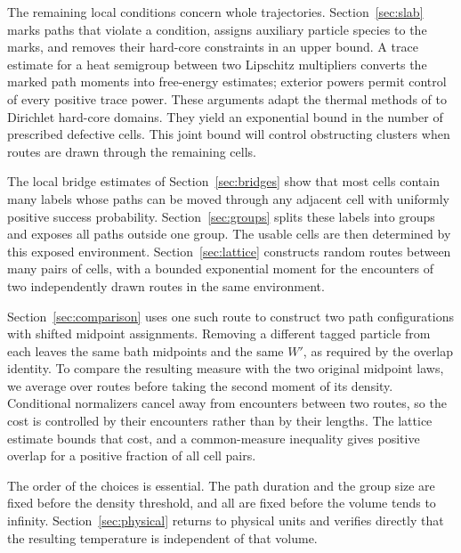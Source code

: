 The remaining local conditions concern whole trajectories.
Section~\ref{sec:slab} marks paths that violate a condition, assigns
auxiliary particle species to the marks, and removes their hard-core
constraints in an upper bound. A trace estimate for a heat semigroup
between two Lipschitz multipliers converts the marked path moments into
free-energy estimates; exterior powers permit control of every positive
trace power. These arguments adapt the thermal methods of \citet{B} to
Dirichlet hard-core domains. They yield an exponential bound in the number
of prescribed defective cells. This joint bound will control obstructing
clusters when routes are drawn through the remaining cells.

The local bridge estimates of Section~\ref{sec:bridges} show that most
cells contain many labels whose paths can be moved through any adjacent
cell with uniformly positive success probability.
Section~\ref{sec:groups} splits these labels into groups and exposes all
paths outside one group. The usable cells are then determined by this
exposed environment. Section~\ref{sec:lattice} constructs random routes
between many pairs of cells, with a bounded exponential moment for the
encounters of two independently drawn routes in the same environment.

Section~\ref{sec:comparison} uses one such route to construct two path
configurations with shifted midpoint assignments. Removing a different
tagged particle from each leaves the same bath midpoints and the same
$W'$, as required by the overlap identity. To compare the resulting
measure with the two original midpoint laws, we average over routes before
taking the second moment of its density. Conditional normalizers cancel
away from encounters between two routes, so the cost is controlled by
their encounters rather than by their lengths. The lattice estimate bounds
that cost, and a common-measure inequality gives positive overlap for a
positive fraction of all cell pairs.

The order of the choices is essential. The path duration and the group
size are fixed before the density threshold, and all are fixed before
the volume tends to infinity. Section~\ref{sec:physical} returns to
physical units and verifies directly that the resulting temperature is
independent of that volume.
